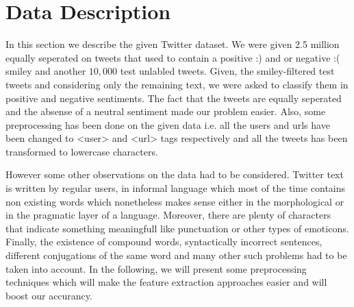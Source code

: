 \section{Data Description}
\label{sec:data_description}
In this section we describe the given Twitter dataset. We were given 2.5 million
equally seperated on tweets that used to contain a positive :) and or negative :( smiley and another $10,000$ test unlabled tweets. Given, the smiley-filtered test tweets and considering only the remaining text, we were asked to classify them in positive and negative sentiments. The fact that the tweets are equally seperated and the absense of a neutral sentiment made our problem easier. Also, some preprocessing has been done on the given data i.e. all the users and urls have been changed to <user> and <url> tags respectively and all the tweets has been transformed to lowercase characters.

However some other observations on the data had to be considered. Twitter text is written by regular users, in informal language which most of the time contains non existing words which nonetheless makes sense either in the morphological or in the pragmatic layer of a language. Moreover, there are plenty of characters that indicate something meaningfull like punctuation or other types of emoticons. Finally, the existence of compound words, syntactically incorrect sentences, different conjugations of the same word and many other such problems had to be taken into account. In the following, we will present some preprocessing techniques which will make the feature extraction approaches easier and will boost our accurancy.